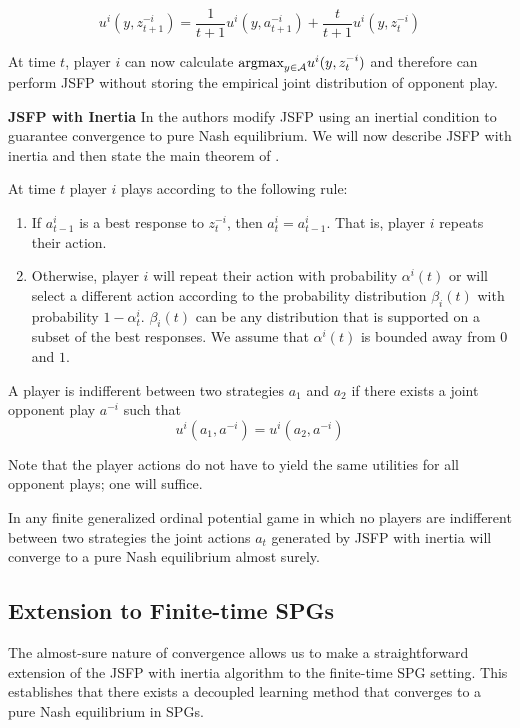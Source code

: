 $$
u^i(y, z^{-i}_{t+1}) = \frac{1}{t+1} u^i(y, a^{-i}_{t+1}) + \frac{t}{t+1} u^i(y, z^{-i}_t)
$$

At time $t$, player $i$ can now calculate $\text{argmax}_{y \in \AA} u^i(y, z^{-i}_t)$ and therefore can perform JSFP without storing the empirical joint distribution of opponent play.


{\bf JSFP with Inertia} In \cite{marden2009joint} the authors modify JSFP using an inertial condition to guarantee convergence to pure Nash equilibrium. We will now describe JSFP with inertia and then state the main theorem of \cite{marden2009joint}.

At time $t$ player $i$ plays according to the following rule:
\begin{enumerate}
\item If $a_{t-1}^i$ is a best response to $z^{-i}_t$, then $a_t^i = a_{t-1}^i$. That is, player $i$ repeats their action.
\item Otherwise, player $i$ will repeat their action with probability $\alpha^i(t)$ or will select a different action according to the probability distribution $\beta_i(t)$ with probability $1-\alpha^i_t$. $\beta_i(t)$ can be any distribution that is supported on a subset of the best responses. We assume that $\alpha^i(t)$ is bounded away from $0$ and $1$. 
\end{enumerate}

\begin{mydef}
A player is indifferent between two strategies $a_1$ and $a_2$ if there exists a joint opponent play $a^{-i}$ such that
$$
u^i(a_1, a^{-i}) = u^i(a_2, a^{-i})
$$

Note that the player actions do not have to yield the same utilities for all opponent plays; one will suffice.
\end{mydef}


\begin{thm}\cite{marden2009joint}
In any finite generalized ordinal potential game in which no players are indifferent between two strategies the joint actions $a_t$ generated by JSFP with inertia will converge to a pure Nash equilibrium almost surely.
\label{thm:jsfp}
\end{thm}


\subsection{Extension to Finite-time SPGs}


The almost-sure nature of convergence allows us to make a straightforward extension of the JSFP with inertia algorithm to the finite-time SPG setting. This establishes that there exists a decoupled learning method that converges to a pure Nash equilibrium in SPGs.

